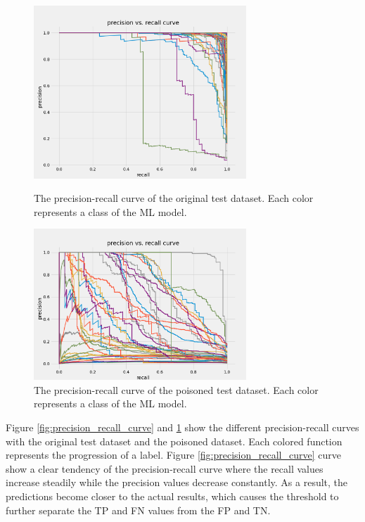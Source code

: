 \begin{figure}[!tbp]
  \centering
  \begin{minipage}[b]{0.4\textwidth}
    \includegraphics[width=8cm]{pictures/precision_recall_curve.png}
    \caption{The precision-recall curve of the original test dataset. Each color represents a class of the ML model.}
    \label{fig:precision_recall_curve}
  \end{minipage}
  \hfill
  \begin{minipage}[b]{0.4\textwidth}
    \includegraphics[width=8cm]{pictures/poisoned_precision_recall.png}
    \caption{The precision-recall curve of the poisoned test dataset. Each color represents a class of the ML model.}
    \label{fig:poisoned_precision_recall}
  \end{minipage}
\end{figure}

Figure \ref{fig:precision_recall_curve} and \ref{fig:poisoned_precision_recall} show the different precision-recall curves with the original test dataset and the poisoned dataset. Each colored function represents the progression of a label. Figure \ref{fig:precision_recall_curve} curve show a clear tendency of the precision-recall curve where the recall values increase steadily while the precision values decrease constantly. As a result, the predictions become closer to the actual results, which causes the threshold to further separate the TP and FN values from the FP and TN. 

